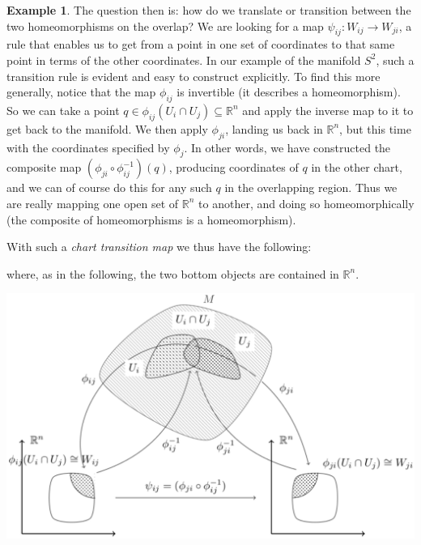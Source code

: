 \documentclass[11pt]{book}
\theoremstyle{definition}
\newtheorem{example}{Example}[section]
\theoremstyle{definition}
\theoremstyle{definition}
\theoremstyle{theorem}
\theoremstyle{definition}
\begin{document}
\begin{example}
	The question then is: how do we translate or transition between the two homeomorphisms on the overlap? We are looking for a map $\psi_{ij}: W_{ij} \rightarrow W_{ji}$, a rule that enables us to get from a point in one set of coordinates to that same point in terms of the other coordinates. In our example of the manifold $S^2$, such a transition rule is evident and easy to construct explicitly. To find this more generally, notice that the map $\phi_{ij}$ is invertible (it describes a homeomorphism). So we can take a point $q \in \phi_{ij}(U_i \cap U_j) \subseteq \mathbb{R}^n$ and apply the inverse map to it to get back to the manifold. We then apply $\phi_{ji}$, landing us back in $\mathbb{R}^n$, but this time with the coordinates specified by $\phi_j$. In other words, we have constructed the composite map $(\phi_{ji} \circ \phi^{-1}_{ij})(q)$, producing coordinates of $q$ in the other chart, and we can of course do this for any such $q$ in the overlapping region. Thus we are really mapping one open set of $\mathbb{R}^n$ to another, and doing so homeomorphically (the composite of homeomorphisms is a homeomorphism).
	\par 
	With such a \textit{chart transition map} we thus have the following:
	\begin{center} 
	\end{center} 
	where, as in the following, the two bottom objects are contained in $\mathbb{R}^n$. 
	\begin{center} 
		\hspace*{-0.2cm}	
		\includegraphics[scale=0.32]{Manifold2BW.png}

\end{center}
\end{example}
\end{document}

